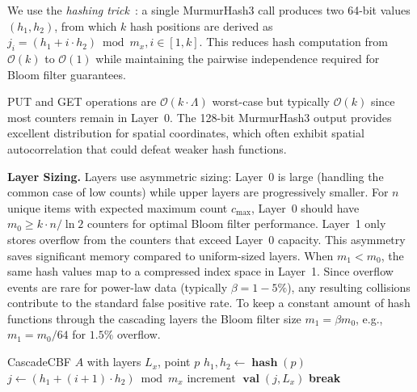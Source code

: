\documentclass[agile, final]{copernicus-agile}
\DeclareMathOperator{\val}{\textbf{val}}
\DeclareMathOperator{\hashfn}{\textbf{hash}}
\begin{document}
We use the \emph{hashing trick}~\citep{kirsch2006less}: a single MurmurHash3 call produces two 64-bit values $(h_1, h_2)$, from which $k$ hash positions are derived as $j_i = (h_1 + i \cdot h_2) \bmod m_x, i \in [1,k]$. This reduces hash computation from $\mathcal{O}(k)$ to $\mathcal{O}(1)$ while maintaining the pairwise independence required for Bloom filter guarantees.

PUT and GET operations are $\mathcal{O}(k \cdot \Lambda)$ worst-case but typically $\mathcal{O}(k)$ since most counters remain in Layer~0. The 128-bit MurmurHash3 output provides excellent distribution for spatial coordinates, which often exhibit spatial autocorrelation that could defeat weaker hash functions.

\textbf{Layer Sizing.} Layers use asymmetric sizing: Layer~0 is large (handling the common case of low counts) while upper layers are progressively smaller. For $n$ unique items with expected maximum count $c_{\max}$, Layer~0 should have $m_0 \geq k \cdot n / \ln 2$ counters for optimal Bloom filter performance. Layer~1 only stores overflow from the  counters that exceed Layer~0 capacity. This asymmetry saves significant memory compared to uniform-sized layers.
When $m_1 < m_0$, the same hash values map to a compressed index space in Layer~1.
Since overflow events are rare for power-law data (typically $\beta=1-5\%$),
any resulting collisions contribute to the standard false positive rate. To keep a constant amount of hash functions through the cascading layers the Bloom filter size $m_1=\beta   m_0$, e.g., $m_1 = m_0/64$ for $1.5 \%$ overflow.

\begin{algorithm}[ht]
\caption{PUT Operation}
\label{alg:put}
\begin{algorithmic}[1]
\REQUIRE CascadeCBF $A$ with layers $L_x$, point $p$
\STATE $h_1, h_2 \gets \hashfn(p)$
    \STATE $j \gets (h_1 + (i+1) \cdot h_2) \bmod m_x$
    \IF{overflow bit at $\val(j, L_x)$ not set}
      \STATE increment $\val(j, L_x)$
      \STATE \textbf{break} 
    \ENDIF
  \ENDFOR
\ENDFOR
\end{algorithmic}
\end{algorithm}
\end{document}
